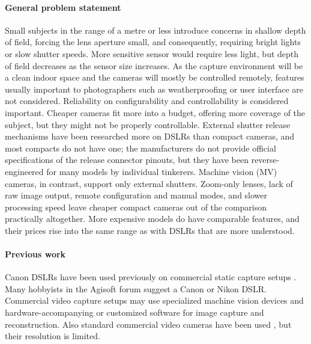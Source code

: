 \paragraph{General problem statement}
Small subjects in the range of a metre or less introduce concerns in shallow depth of field, forcing the lens aperture small, and consequently, requiring bright lights or slow shutter speeds.
More sensitive sensor would require less light, but depth of field decreases as the sensor size increases.
As the capture environment will be a clean indoor space and the cameras will mostly be controlled remotely, features usually important to photographers such as weatherproofing or user interface are not considered.
Reliability on configurability and controllability is considered important.
Cheaper cameras fit more into a budget, offering more coverage of the subject, but they might not be properly controllable.
External shutter release mechanisms have been researched more on DSLRs than compact cameras, and most compacts do not have one;
the manufacturers do not provide official specifications of the release connector pinouts, but they have been reverse-engineered for many models by individual tinkerers.
Machine vision (MV) cameras, in contrast, support only external shutters.
Zoom-only lenses, lack of raw image output, remote configuration and manual modes, and slower processing speed leave cheaper compact cameras out of the comparison practically altogether.
More expensive models do have comparable features, and their prices rise into the same range as with DSLRs that are more understood.

\paragraph{Previous work}
Canon DSLRs have been used previously on commercial static capture setups \cite{ir-ltd,ten24,capturelab,agisoftforum}.
Many hobbyists in the Agisoft forum suggest a Canon or Nikon DSLR. \cite{agisoftforum}
Commercial video capture setups may use specialized machine vision devices and hardware-accompanying or customized software for image capture and reconstruction. \cite{TODO}
Also standard commercial video cameras have been used \cite{bradley2010high}, but their resolution is limited.

